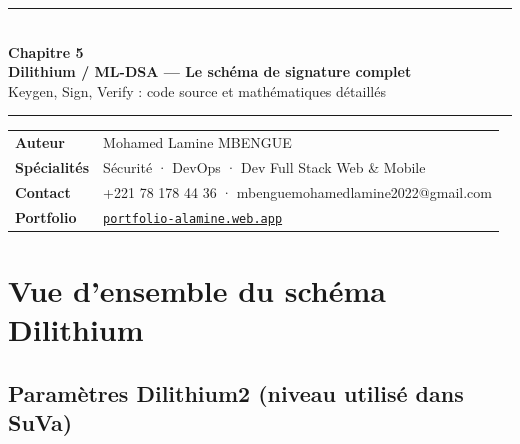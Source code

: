 \documentclass[12pt, a4paper]{article}
\begin{document}
\begin{center}
  {\color{suva_blue}\rule{\linewidth}{2pt}}\\[0.5cm]
  {\Huge\bfseries\color{suva_blue} Chapitre 5}\\[0.3cm]
  {\large\bfseries Dilithium / ML-DSA --- Le schéma de signature complet}\\[0.2cm]
  {\small\color{gray} Keygen, Sign, Verify : code source et mathématiques détaillés}\\[0.3cm]
  {\color{suva_blue}\rule{\linewidth}{2pt}}
\end{center}

\vspace{0.3cm}
\begin{tcolorbox}[colback=suva_blue!5, colframe=suva_blue!40,
  left=6pt, right=6pt, top=4pt, bottom=4pt]
\small
\begin{tabular}{ll}
  \textbf{Auteur}      & Mohamed Lamine MBENGUE \\
  \textbf{Spécialités} & Sécurité · DevOps · Dev Full Stack Web \& Mobile \\
  \textbf{Contact}     & +221 78 178 44 36 · mbenguemohamedlamine2022@gmail.com \\
  \textbf{Portfolio}   & \href{https://portfolio-alamine.web.app}{\texttt{portfolio-alamine.web.app}} \\
\end{tabular}
\end{tcolorbox}
\vspace{0.3cm}

\tableofcontents
\newpage

\section{Vue d'ensemble du schéma Dilithium}

\subsection{Paramètres Dilithium2 (niveau utilisé dans SuVa)}
\end{document}
